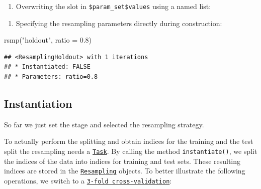 \documentclass[
]{scrbook}
\newenvironment{Shaded}{\begin{snugshade}}{\end{snugshade}}
\newcommand{\AttributeTok}[1]{\textcolor[rgb]{0.77,0.63,0.00}{#1}}
\newcommand{\FloatTok}[1]{\textcolor[rgb]{0.00,0.00,0.81}{#1}}
\newcommand{\FunctionTok}[1]{\textcolor[rgb]{0.00,0.00,0.00}{#1}}
\newcommand{\NormalTok}[1]{#1}
\newcommand{\OtherTok}[1]{\textcolor[rgb]{0.56,0.35,0.01}{#1}}
\newcommand{\SpecialCharTok}[1]{\textcolor[rgb]{0.00,0.00,0.00}{#1}}
\newcommand{\StringTok}[1]{\textcolor[rgb]{0.31,0.60,0.02}{#1}}
\providecommand{\tightlist}{%
  \setlength{\itemsep}{0pt}\setlength{\parskip}{0pt}}
\renewenvironment{Shaded} {\begin{snugshade}\small} {\end{snugshade}}
\begin{document}
\begin{enumerate}
\def\labelenumi{\arabic{enumi}.}
\tightlist
\item
  Overwriting the slot in \texttt{\$param\_set\$values} using a named list:
\end{enumerate}

\begin{Shaded}
\end{Shaded}

\begin{enumerate}
\def\labelenumi{\arabic{enumi}.}
\setcounter{enumi}{1}
\tightlist
\item
  Specifying the resampling parameters directly during construction:
\end{enumerate}

\begin{Shaded}
\begin{Highlighting}[]
\FunctionTok{rsmp}\NormalTok{(}\StringTok{"holdout"}\NormalTok{, }\AttributeTok{ratio =} \FloatTok{0.8}\NormalTok{)}
\end{Highlighting}
\end{Shaded}

\begin{verbatim}
## <ResamplingHoldout> with 1 iterations
## * Instantiated: FALSE
## * Parameters: ratio=0.8
\end{verbatim}

\hypertarget{resampling-inst}{%
\subsection{Instantiation}\label{resampling-inst}}

So far we just set the stage and selected the resampling strategy.

To actually perform the splitting and obtain indices for the training and the test split the resampling needs a \href{https://mlr3.mlr-org.com/reference/Task.html}{\texttt{Task}}.
By calling the method \texttt{instantiate()}, we split the indices of the data into indices for training and test sets.
These resulting indices are stored in the \href{https://mlr3.mlr-org.com/reference/Resampling.html}{\texttt{Resampling}} objects.
To better illustrate the following operations, we switch to a \href{https://mlr3.mlr-org.com/reference/mlr_resamplings_cv.html}{\texttt{3-fold\ cross-validation}}:
\end{document}
